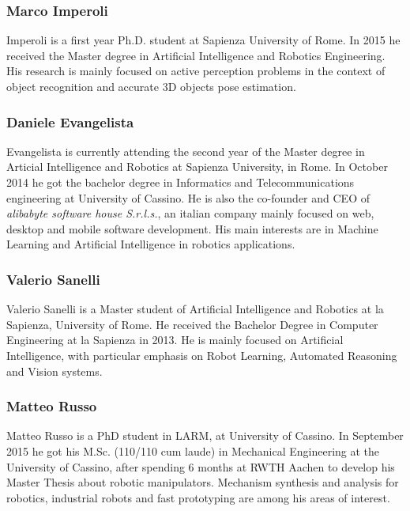 \documentclass[conference]{IEEEtran}
\begin{document}
\subsubsection*{Marco Imperoli}
Imperoli is a first year Ph.D. student at Sapienza University of Rome. 
In 2015 he received the Master degree in Artificial Intelligence and Robotics Engineering. 
His research is mainly focused on active perception problems in the context of object recognition and accurate 3D objects pose estimation. 

\subsubsection*{Daniele Evangelista}
Evangelista is currently attending the second year of the Master degree in Articial Intelligence and Robotics at Sapienza University, in Rome. 
In October 2014 he got the bachelor degree in Informatics and Telecommunications engineering at University of Cassino. 
He is also the co-founder and CEO of \emph{alibabyte software house S.r.l.s.}, an italian company mainly focused on web, desktop and mobile 
software development. His main interests are in Machine Learning and Artificial Intelligence in robotics applications.

\subsubsection*{Valerio Sanelli}
Valerio Sanelli is a Master student of Artificial Intelligence and Robotics at la Sapienza, University of Rome.
He received the Bachelor Degree in Computer Engineering at la Sapienza in 2013.
He is mainly focused on Artificial Intelligence, with particular  emphasis on Robot Learning, Automated Reasoning and Vision systems.

\subsubsection*{Matteo Russo}
Matteo Russo is a PhD student in LARM, at University of Cassino. In September 2015 he got his M.Sc. (110/110 cum laude) in Mechanical Engineering 
at the University of Cassino, after spending 6 months at RWTH Aachen to develop his Master Thesis about robotic manipulators. 
Mechanism synthesis and analysis for robotics, industrial robots and fast prototyping are among his areas of interest.
\end{document}

